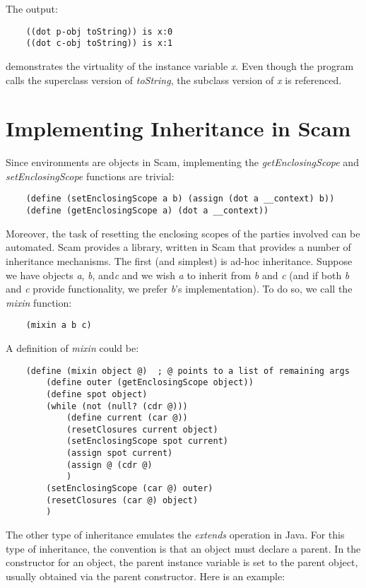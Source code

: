 The output:

\begin{verbatim}
    ((dot p-obj toString)) is x:0
    ((dot c-obj toString)) is x:1
\end{verbatim}

demonstrates the virtuality of the instance variable \emph{x}.  Even
though the program calls the superclass version of \emph{toString},
the subclass version of \emph{x} is referenced.

\section{Implementing Inheritance in Scam}

Since environments are objects in Scam, implementing the {\it
getEnclosingScope} and {\it setEnclosingScope} functions are trivial:

\begin{verbatim}
    (define (setEnclosingScope a b) (assign (dot a __context) b))
    (define (getEnclosingScope a) (dot a __context))
\end{verbatim}

Moreover, the task of resetting the enclosing scopes of the parties
involved can be automated. Scam provides a library, written in Scam that
provides a number of inheritance mechanisms. The first (and simplest)
is ad-hoc inheritance. Suppose we have objects {\it a}, {\it b}, and{\it  c}
and we wish
{\it a} to inherit from {\it b} and {\it c}
(and if both {\it b} and {\it c} provide functionality,
we prefer {\it b}'s implementation).
To do so, we call the {\it mixin} function:

\begin{verbatim}
    (mixin a b c)
\end{verbatim}

A definition of {\it mixin} could be:

\begin{verbatim}
    (define (mixin object @)  ; @ points to a list of remaining args
        (define outer (getEnclosingScope object))
        (define spot object)
        (while (not (null? (cdr @)))
            (define current (car @))
            (resetClosures current object)
            (setEnclosingScope spot current)
            (assign spot current)
            (assign @ (cdr @)
            )
        (setEnclosingScope (car @) outer)
        (resetClosures (car @) object)
        )
\end{verbatim}

The other type of inheritance emulates the {\it extends} operation in
Java.  For this type of inheritance, the convention is that an object
must declare a parent. In the constructor for an object, the parent
instance variable is set to the parent object, usually obtained via the
parent constructor.  Here is an example:

